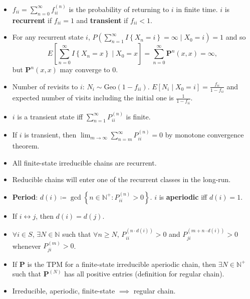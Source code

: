 \documentclass[10pt]{article}
\begin{document}
\begin{multicols*}{2}
\begin{itemize}
            \item $f_{ii} = \sum_{n = 0}^{\infty}f_{ii}^{\left(n\right)}$ is the probability of returning to $i$ in finite time. $i$ is \textbf{recurrent} if $f_{ii} = 1$ and \textbf{transient} if $f_{ii} < 1$.
            \item For any recurrent state $i$, $P\left(\sum_{n = 1}^{\infty}I\left\{X_n = i\right\} = \infty \mid X_0 = i\right) = 1$ and so 
            \begin{equation*}
                E\left[\sum_{n = 0}^{\infty}I{\left\{X_n = x\right\}} \mid X_0 = x\right] = \sum_{n = 0}^{\infty}\bm{P}^n\left(x, x\right) = \infty,
            \end{equation*}
            but $\bm{P}^n\left(x, x\right)$ may converge to $0$.
            \item Number of revisits to $i$: $N_i \sim \mathrm{Geo}\left(1 - f_{ii}\right)$. $E\left[N_i \mid X_0 = i\right] = \frac{f_{ii}}{1 - f_{ii}}$ and expected number of visits including the initial one is $\frac{1}{1 - f_{ii}}$.
            \item $i$ is a transient state iff $\sum_{n = 1}^{\infty}P_{ii}^{\left(n\right)}$ is finite.
            \item If $i$ is transient, then $\lim_{m \to \infty}\sum_{n = m}^{\infty}P_{ii}^{\left(n\right)} = 0$ by monotone convergence theorem.
            \item All finite-state irreducible chains are recurrent.
            \item Reducible chains will enter one of the recurrent classes in the long-run.
            \item \textbf{Period}: $d\left(i\right) \coloneqq \gcd\left\{n \in \mathbb{N}^+ \colon P_{ii}^{\left(n\right)} > 0\right\}$. $i$ is \textbf{aperiodic} iff $d\left(i\right) = 1$.
            \item If $i \leftrightarrow j$, then $d\left(i\right) = d\left(j\right)$.
            \item $\forall i \in S$, $\exists N \in \mathbb{N}$ such that $\forall n \geq N$, $P_{ii}^{\left(n \cdot d\left(i\right)\right)} > 0$ and $P_{ji}^{\left(m + n \cdot d\left(i\right)\right)} > 0$ whenever $P_{ji}^{\left(m\right)} > 0$.
            \item If $\bm{P}$ is the TPM for a finite-state irreducible aperiodic chain, then $\exists N \in \mathbb{N}^+$ such that $\bm{P}^{\left(N\right)}$ has all positive entries (definition for regular chain).
            \item Irreducible, aperiodic, finite-state $\implies$ regular chain.

\end{itemize}
\end{multicols*}
\end{document}
